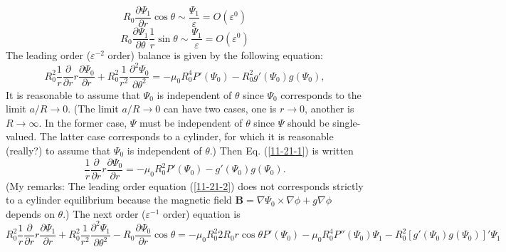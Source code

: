 \documentclass{article}
\begin{document}
\begin{equation}
  R_0 \frac{\partial \Psi_1}{\partial r} \cos \theta \sim
  \frac{\Psi_1}{\varepsilon} = O (\varepsilon^0)
\end{equation}
\begin{equation}
  R_0 \frac{\partial \Psi_1}{\partial \theta}  \frac{1}{r} \sin \theta \sim
  \frac{\Psi_1}{\varepsilon} = O (\varepsilon^0)
\end{equation}
The leading order ($\varepsilon^{- 2}$ order) balance is given by the
following equation:
\begin{equation}
  \label{11-21-1} R_0^2 \frac{1}{r}  \frac{\partial}{\partial r} r
  \frac{\partial \Psi_0}{\partial r} + R_0^2 \frac{1}{r^2}  \frac{\partial^2
  \Psi_0}{\partial \theta^2} = - \mu_0 R_0^4 P' (\Psi_0) - R_0^2 g' (\Psi_0) g
  (\Psi_0),
\end{equation}
It is reasonable to assume that $\Psi_0$ is independent of $\theta$ since
$\Psi_0$ corresponds to the limit $a / R \rightarrow 0$. (The limit $a / R
\rightarrow 0$ can have two cases, one is $r \rightarrow 0$, another is $R
\rightarrow \infty$. In the former case, $\Psi$ must be independent of
$\theta$ since $\Psi$ should be single-valued. The latter case corresponds to
a cylinder, for which it is reasonable (really?) to assume that $\Psi_0$ is
independent of $\theta$.) Then Eq. (\ref{11-21-1}) is written
\begin{equation}
  \label{11-21-2} \frac{1}{r}  \frac{\partial}{\partial r} r \frac{\partial
  \Psi_0}{\partial r} = - \mu_0 R_0^2 P' (\Psi_0) - g' (\Psi_0) g (\Psi_0) .
\end{equation}
(My remarks: The leading order equation (\ref{11-21-2}) does not corresponds
strictly to a cylinder equilibrium because the magnetic field $\mathbf{B}=
\nabla \Psi_0 \times \nabla \phi + g \nabla \phi$ depends on $\theta$.) The
next order ($\varepsilon^{- 1}$ order) equation is
\[ R_0^2 \frac{1}{r}  \frac{\partial}{\partial r} r \frac{\partial
   \Psi_1}{\partial r} + R_0^2 \frac{1}{r^2}  \frac{\partial^2
   \Psi_1}{\partial \theta^2} - R_0  \frac{\partial \Psi_0}{\partial r} \cos
   \theta = - \mu_0 R_0^2 2 R_0 r \cos \theta P' (\Psi_0) - \mu_0 R_0^4 P''
   (\Psi_0) \Psi_1 - R_0^2 [g' (\Psi_0) g (\Psi_0)]' \Psi_1 \]
\end{document}
